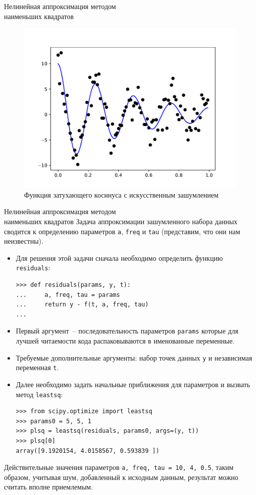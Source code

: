 \documentclass[aspectratio=169, mathserif]{beamer}	%
\begin{document}
\begin{frame}[fragile, label=c]{Нелинейная аппроксимация методом \\ наименьших квадратов}
\scriptsize
\begin{figure}[h!]
	\centering
	\includegraphics[width=.6\linewidth]{./pics/Figure_38}
	\caption{Функция затухающего косинуса с искусственным зашумлением}
\end{figure}
\vfill
\end{frame}

\begin{frame}[fragile, label=c]{Нелинейная аппроксимация методом \\ наименьших квадратов}
\scriptsize
Задача аппроксимации зашумленного набора данных сводится к определению параметров \texttt{a}, \texttt{freq} и \texttt{tau} (представим, что они нам неизвестны).
\vfill
\begin{itemize}
	\item Для решения этой задачи сначала необходимо определить функцию \texttt{residuals}:
\vfill
\begin{verbatim}
>>> def residuals(params, y, t):
...     a, freq, tau = params
...     return y - f(t, a, freq, tau)
...
\end{verbatim}
\vfill
	\item Первый аргумент~-- последовательность параметров \texttt{params} которые для лучшей читаемости кода распаковываются в именованные переменные.
	\item Требуемые дополнительные аргументы: набор точек данных \texttt{y} и независимая переменная \texttt{t}.
	\item Далее необходимо задать начальные приближения для параметров и вызвать метод \texttt{leastsq}:
\vfill
\begin{verbatim}
>>> from scipy.optimize import leastsq
>>> params0 = 5, 5, 1
>>> plsq = leastsq(residuals, params0, args=(y, t))
>>> plsq[0]
array([9.1920154, 4.0158567, 0.593839 ])
\end{verbatim}
\end{itemize}
\vfill
Действительные значения параметров \texttt{a, freq, tau = 10, 4, 0.5}, таким образом, учитывая шум, добавленный к исходным данным, результат можно считать вполне приемлемым.
\vfill
\end{frame}
\end{document}
